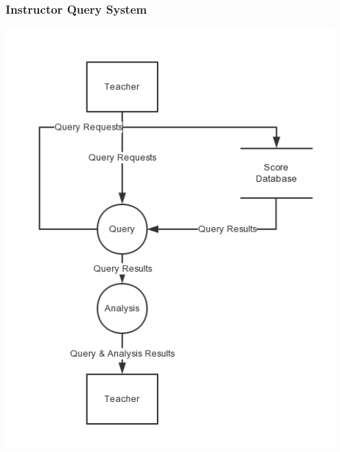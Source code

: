 \documentclass[a4]{article}
\begin{document}
\subsubsection{Instructor Query System}
\includegraphics[width=5in]{pic/2-3.png}
\end{document}
